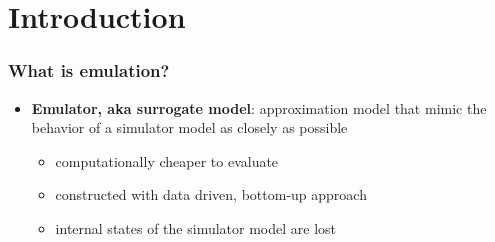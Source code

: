 \documentclass[xcolor=dvipsnames, USenglish]{beamer}  %
\begin{document}
\section{Introduction}

  \begin{frame}
    \frametitle{What is emulation?}
    \begin{itemize}
      \item \textbf{Emulator, aka surrogate model}: approximation model that mimic
      the behavior of a simulator model as closely as possible
      \begin{itemize}
        \item computationally cheaper to evaluate
        \item constructed with data driven, bottom-up approach
        \item internal states of the simulator model are lost
      \end{itemize}
    \end{itemize}

    \begin{figure}[b]
      \centering
    \end{figure}
  \end{frame}


\end{document}
